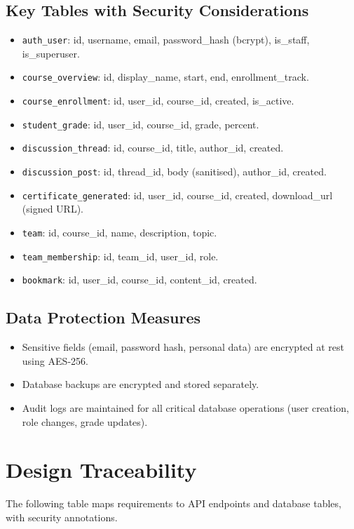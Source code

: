\subsection{Key Tables with Security Considerations}
\begin{itemize}
    \item \texttt{auth\_user}: id, username, email, password\_hash (bcrypt), is\_staff, is\_superuser.
    \item \texttt{course\_overview}: id, display\_name, start, end, enrollment\_track.
    \item \texttt{course\_enrollment}: id, user\_id, course\_id, created, is\_active.
    \item \texttt{student\_grade}: id, user\_id, course\_id, grade, percent.
    \item \texttt{discussion\_thread}: id, course\_id, title, author\_id, created.
    \item \texttt{discussion\_post}: id, thread\_id, body (sanitised), author\_id, created.
    \item \texttt{certificate\_generated}: id, user\_id, course\_id, created, download\_url (signed URL).
    \item \texttt{team}: id, course\_id, name, description, topic.
    \item \texttt{team\_membership}: id, team\_id, user\_id, role.
    \item \texttt{bookmark}: id, user\_id, course\_id, content\_id, created.
\end{itemize}

\subsection{Data Protection Measures}
\begin{itemize}
    \item Sensitive fields (email, password hash, personal data) are encrypted at rest using AES‑256.
    \item Database backups are encrypted and stored separately.
    \item Audit logs are maintained for all critical database operations (user creation, role changes, grade updates).
\end{itemize}

\section{Design Traceability}
The following table maps requirements to API endpoints and database tables, with security annotations.

